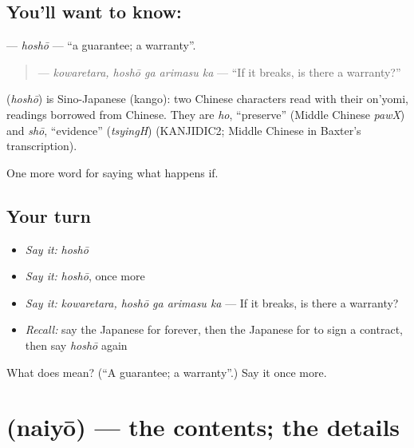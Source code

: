 \subsection*{You'll want to know: }
\textbf{} — \emph{hoshō} — \textquotedblleft{}a guarantee; a warranty\textquotedblright{}.

\begin{quote}
\textbf{ } — \emph{kowaretara, hoshō ga arimasu ka} — \textquotedblleft{}If it breaks, is there a warranty?\textquotedblright{}
\end{quote}

\begin{cousinweb}
\textbf{} (\emph{hoshō}) is Sino-Japanese (kango): two Chinese characters read with their on'yomi, readings borrowed from Chinese. They are \emph{ho}, \textquotedblleft{}preserve\textquotedblright{} (Middle Chinese \emph{pawX}) and \emph{shō}, \textquotedblleft{}evidence\textquotedblright{} (\emph{tsyingH}) (KANJIDIC2; Middle Chinese in Baxter's transcription).
\end{cousinweb}

\begin{grammarlens}[title={What you've built}]
One more word for saying what happens if.
\end{grammarlens}

\subsection*{Your turn}
\begin{itemize}
\raggedright
  \item \emph{Say it:} \emph{hoshō}
  \item \emph{Say it:} \emph{hoshō}, once more
  \item \emph{Say it:} \emph{kowaretara, hoshō ga arimasu ka} — If it breaks, is there a warranty?
  \item \emph{Recall:} say the Japanese for forever, then the Japanese for to sign a contract, then say \emph{hoshō} again
\end{itemize}

\begin{tcolorbox}[breakable,colback=teal!4,colframe=teal!35!black,title={Before you move on}]
What does  mean? (\textquotedblleft{}A guarantee; a warranty\textquotedblright{}.) Say it once more.
\end{tcolorbox}
\section[\texorpdfstring{\ja{ないよう} (naiyō)}{ないよう (naiyō)}]{ (naiyō) — the contents; the details}

